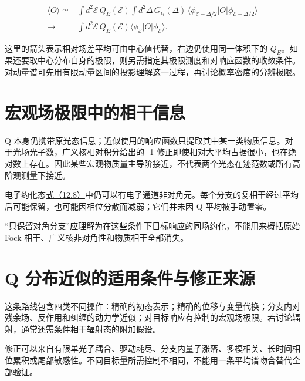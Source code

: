 \documentclass[UTF8,a4paper,zihao=-4,openany,fontset=fandol]{ctexbook}
\begin{document}
\begin{equation*}
\begin{aligned}
\langle O\rangle \simeq {}&
\int d^2\mathcal E\,Q_E(\mathcal E)
\int d^2\Delta\,G_{\epsilon_l}(\Delta)\,
\langle\phi_{\mathcal E-\Delta/2}|O|\phi_{\mathcal E+\Delta/2}\rangle\\
\longrightarrow{}&
\int d^2\mathcal E\,Q_E(\mathcal E)
\langle\phi_{\mathcal E}|O|\phi_{\mathcal E}\rangle .
\end{aligned}
\tag{12.8a}\label{eq:12.8a}
\end{equation*}


这里的箭头表示相对场差平均可由中心值代替，右边仍使用同一体积下的 $Q_E$。如果还要取中心分布自身的极限，则另需指定其极限测度和对响应函数的收敛条件。对动量谱可先用有限动量区间的投影理解这一过程，再讨论概率密度的分辨极限。



\section{宏观场极限中的相干信息}\label{sec:12:10}


Q 本身仍携带原光态信息；近似使用的响应函数只提取其中某一类物质信息。对于光场光子数，广义核相对积分给出的 -1 修正即使相对大平均占据很小，也在绝对数上存在。因此某些宏观物质量主导阶接近，不代表两个光态在迹范数或所有高阶观测量下接近。



电子约化态\hyperref[eq:12.8]{式（12.8）}中仍可以有电子通道非对角元。每个分支的复相干经过平均后可能保留，也可能因相位分散而减弱；它们并未因 Q 平均被手动置零。



“只保留对角分支”应理解为在这些条件下目标响应的同场约化，不能用来概括原始 Fock 相干、广义核非对角性和物质相干全部消失。



\section{Q 分布近似的适用条件与修正来源}\label{sec:12:11}


这条路线包含四类不同操作：精确的初态表示；精确的位移与变量代换；分支内对残余场、反作用和纠缠的动力学近似；对目标响应有控制的宏观场极限。若讨论辐射，通常还需条件相干辐射态的附加假设。



修正可以来自有限单光子耦合、驱动耗尽、分支内量子涨落、多模相关、长时间相位累积或尾部敏感性。不同目标量所需控制不相同，不能用一条平均谱吻合替代全部验证。
\end{document}
